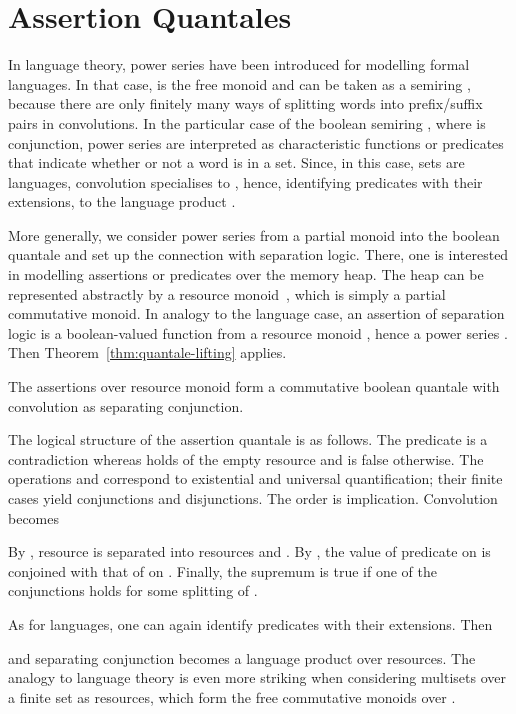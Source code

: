 \documentclass[twoside,runningheads,envcountsame,envcountsect,oribibl,orivec]{llncs}
\begin{document}
\section{Assertion Quantales}\label{S:assertion_quantale}

In language theory, power series have been introduced for modelling
formal languages.  In that case,  is the free monoid  and
 can be taken as a semiring , because there are
only finitely many ways of splitting words into prefix/suffix pairs in
convolutions.  In the particular case of the boolean semiring
, where  is conjunction, power series  are interpreted as characteristic functions or predicates
that indicate whether or not a word is in a set. Since, in this case,
sets are languages, convolution specialises to , hence, identifying predicates with
their extensions, to the language product .

More generally, we consider power series  from a
partial monoid  into the boolean quantale  and set up
the connection with separation logic. There, one is interested in
modelling assertions or predicates over the memory heap. 
The heap can be
represented abstractly by a resource monoid~\cite{COY07}, which is simply a
partial commutative monoid. In analogy to the
language case, an assertion  of separation logic is a
boolean-valued function from a resource monoid , hence a power
series . Then Theorem~\ref{thm:quantale-lifting}
applies.
\begin{corollary}\label{cor:heap-ass-quantale}
  The assertions  over resource monoid  form a 
  commutative boolean quantale with convolution as separating 
  conjunction. 
\end{corollary}
The logical structure of the assertion quantale  is as
follows. The predicate  is a contradiction whereas 
holds of the empty resource and is false otherwise. The operations
 and  correspond to existential and universal
quantification; their finite cases yield conjunctions and
disjunctions. The order  is implication. Convolution becomes

By , resource  is separated into resources  and
. By , the value of predicate  on  is
conjoined with that of  on . Finally, the supremum is true if
one of the conjunctions holds for some splitting of .

As for languages, one can again identify predicates with their
extensions. Then

and separating conjunction becomes a language product over
resources. The analogy to language theory is even more striking
when considering multisets over a finite set  as resources, which
form the free commutative monoids over .
\end{document}
